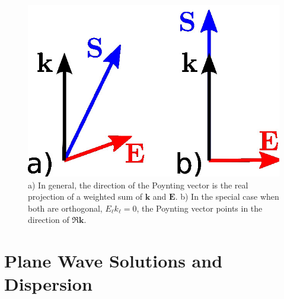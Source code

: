 \documentclass[12pt,a4paper,twoside,openright,BCOR10mm,headsepline,titlepage,abstracton,chapterprefix,final]{scrreprt}
\newcommand\Vector[1]{{\mathbf{#1}}}
\newcommand\wavenumber{k}
\newcommand\Wavevector{\Vector{\wavenumber}}
\newcommand\scalarEfield{E}
\newcommand\Efield{\Vector{\scalarEfield}}
\begin{document}
\begin{figure}
  \centering
   \includegraphics[width=0.35\columnwidth]{graphics/poynting}
  \caption{a) In general, the direction of the Poynting vector is the real projection of a weighted sum of $\Wavevector$ and $\Efield$. b)
In the special case when both are orthogonal, $ \scalarEfield_\ell \wavenumber_\ell = 0$, the Poynting vector points in the direction of $\Re\Wavevector$.
}
  \label{fig:poynting}
\end{figure}


\section{Plane Wave Solutions and Dispersion}
\end{document}
